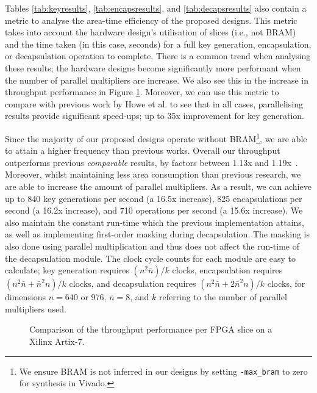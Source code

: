 Tables \ref{tab:keyresults}, \ref{tab:encapsresults}, and \ref{tab:decapsresults} also contain a metric to analyse the area-time efficiency of the proposed designs. This metric takes into account the hardware design's utilisation of slices (i.e., not BRAM) and the time taken (in this case, seconds) for a full key generation, encapsulation, or decapsulation operation to complete. There is a common trend when analysing these results; the hardware designs become significantly more performant when the number of parallel multipliers are increase. We also see this in the increase in throughput performance in Figure \ref{fig:hw_line}. Moreover, we can use this metric to compare with previous work by Howe et al. \cite{howe2018standard} to see that in all cases, parallelising results provide significant speed-ups; up to 35x improvement for key generation.

Since the majority of our proposed designs operate without BRAM\footnote{We ensure BRAM is not inferred in our designs by setting \texttt{-max\_bram} to zero for synthesis in Vivado.}, we are able to attain a higher frequency than previous works. Overall our throughput outperforms previous \emph{comparable} results, by factors between 1.13x and 1.19x~\cite{howe2018standard}. Moreover, whilst maintaining less area consumption than previous research, we are able to increase the amount of parallel multipliers. As a result, we can achieve up to 840 key generations per second (a 16.5x increase), 825 encapsulations per second (a 16.2x increase), and 710 operations per second (a 15.6x increase). We also maintain the constant run-time which the previous implementation attains, as well as implementing first-order masking during decapsulation. The masking is also done using parallel multiplication and thus does not affect the run-time of the decapsulation module. The clock cycle counts for each module are easy to calculate; key generation requires $ (n^2\bar{n}) / k$ clocks, encapsulation requires $ (n^2\bar{n} + \bar{n}^2n)/k $ clocks, and decapsulation requires $(n^2\bar{n} + 2\bar{n}^2n)/k$ clocks, for dimensions $n=640$ or 976, $\bar{n}=8$, and $k$ referring to the number of parallel multipliers used.

\begin{figure}
\centering
    \advance\leftskip-1cm
\resizebox{\columnwidth}{!}{
}
\caption{Comparison of the throughput performance per FPGA slice on a Xilinx Artix-7.}
 \label{fig:hw_line}
\end{figure}